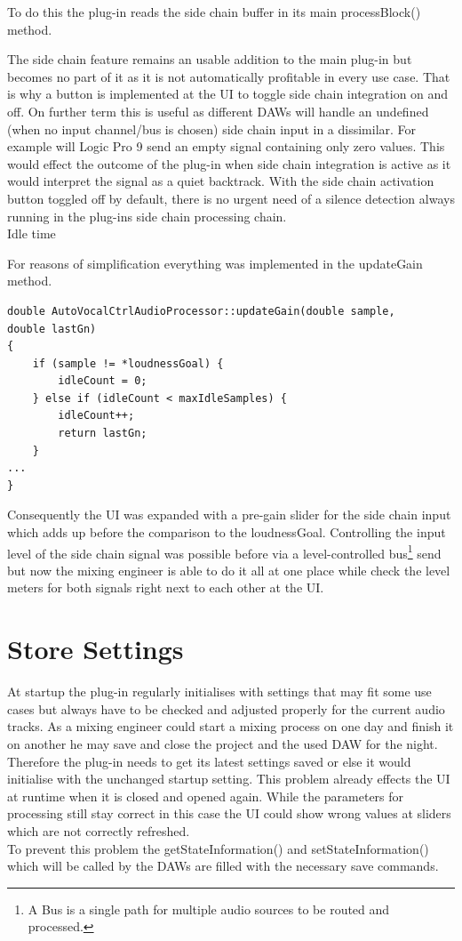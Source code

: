 To do this the plug-in reads the side chain buffer in its main processBlock() method.

The side chain feature remains an usable addition to the main plug-in but becomes no part of it as it is not automatically profitable in every use case. That is why a button is implemented at the UI to toggle side chain integration on and off. On further term this is useful as different DAWs will handle an undefined (when no input channel/bus is chosen) side chain input in a dissimilar. For example will Logic Pro 9 send an empty signal containing only zero values. This would effect the outcome of the plug-in when side chain integration is active as it would interpret the signal as a quiet backtrack. With the side chain activation button toggled off by default, there is no urgent need of a silence detection always running in the plug-ins side chain processing chain.\\

Idle time

For reasons of simplification everything was implemented in the updateGain method.\\

\begin{lstlisting}[frame=single]
double AutoVocalCtrlAudioProcessor::updateGain(double sample, 
double lastGn)
{
    if (sample != *loudnessGoal) {
        idleCount = 0;
    } else if (idleCount < maxIdleSamples) {
        idleCount++;
        return lastGn;
    }
...
}
\end{lstlisting}

Consequently the UI was expanded with a pre-gain slider for the side chain input which adds up before the comparison to the loudnessGoal. Controlling the input level of the side chain signal was possible before via a level-controlled bus\footnote{A Bus is a single path for multiple audio sources to be routed and processed.} send but now the mixing engineer is able to do it all at one place while check the level meters for both signals right next to each other at the UI. 

\section{Store Settings}

At startup the plug-in regularly initialises with settings that may fit some use cases but always have to be checked and adjusted properly for the current audio tracks. As a mixing engineer could start a mixing process on one day and finish it on another he may save and close the project and the used DAW for the night. Therefore the plug-in needs to get its latest settings saved or else it would initialise with the unchanged startup setting. This problem already effects the UI at runtime when it is closed and opened again. While the parameters for processing still stay correct in this case the UI could show wrong values at sliders which are not correctly refreshed.\\
To prevent this problem the getStateInformation() and setStateInformation() which will be called by the DAWs are filled with the necessary save commands.\\


